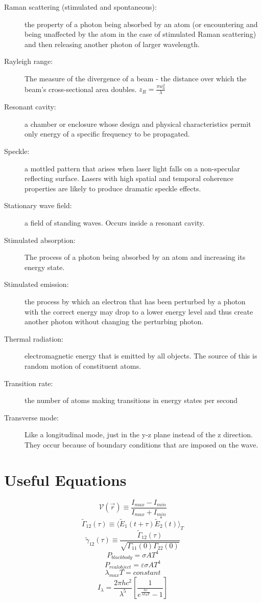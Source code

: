\documentclass[12pt]{report}
\begin{document}
\begin{description}
\item[Raman scattering (stimulated and spontaneous): ] the property of a photon being absorbed by an atom (or encountering and being unaffected by the atom in the case of stimulated Raman scattering) and then releasing another photon of larger wavelength. 
\item[Rayleigh range: ] The measure of the divergence of a beam - the distance over which the beam's cross-sectional area doubles.  $z_R = \frac{\pi w_0^2}{\lambda}$
\item[Resonant cavity: ] a chamber or enclosure whose design and physical characteristics permit only energy of a specific frequency to be propagated. 
\item[Speckle: ] a mottled pattern that arises when laser light falls on a non-specular reflecting surface. Lasers with high spatial and temporal coherence properties are likely to produce dramatic speckle effects. 
\item[Stationary wave field: ] a field of standing waves. Occurs inside a resonant cavity. 
\item[Stimulated absorption: ] The process of a photon being absorbed by an atom and increasing its energy state. 
\item[Stimulated emission: ] the process by which an electron that has been perturbed by a photon with the correct energy may drop to a lower energy level and thus create another photon without changing the perturbing photon. 
\item[Thermal radiation: ] electromagnetic energy that is emitted by all objects. The source of this is random motion of constituent atoms. 
\item[Transition rate: ] the number of atoms making transitions in energy states per second
\item[Transverse mode: ] Like a longitudinal mode, just in the y-z plane instead of the z direction. They occur because of boundary conditions that are imposed on the wave. 
\end{description}

\section{Useful Equations}
\[\mathcal{V}( \vec{r}) \equiv \frac{I_{max} - I_{min}}{I_{max} + I_{min}}\]
\[\tilde{\Gamma}_{12}(\tau) \equiv \langle \tilde{E}_1(t + \tau) \tilde{E}_2 ^* (t) \rangle _T\]
\[\tilde{\gamma}_{12} (\tau) \equiv \frac{\tilde{\Gamma}_{12}(\tau)}{\sqrt{\Gamma_{11}(0)\Gamma_{22}(0)}}\]
\[P_{black body} = \sigma A T^4\]
\[P_{real object} = \varepsilon \sigma A T^4\]
\[\lambda_{max} T = constant\]
\[I_\lambda = \frac{2 \pi h c^2}{\lambda^5} \left[ \frac{1}{e^{\frac{hc}{\lambda k_B T}} -1} \right]\]
\end{document}
